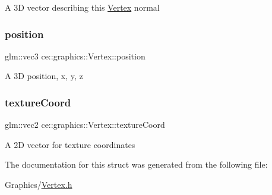 A 3D vector describing this \hyperlink{structce_1_1graphics_1_1_vertex}{Vertex} normal \mbox{\label{structce_1_1graphics_1_1_vertex_aa38ddb0b29a672e67e790869f38282ff}} 
\subsubsection{\texorpdfstring{position}{position}}
{\footnotesize\ttfamily glm\+::vec3 ce\+::graphics\+::\+Vertex\+::position}

A 3D position, x, y, z \mbox{\label{structce_1_1graphics_1_1_vertex_a1dd8f6082878c241afc66226b3c45ea0}} 
\subsubsection{\texorpdfstring{texture\+Coord}{textureCoord}}
{\footnotesize\ttfamily glm\+::vec2 ce\+::graphics\+::\+Vertex\+::texture\+Coord}

A 2D vector for texture coordinates 

The documentation for this struct was generated from the following file\+:\begin{DoxyCompactItemize}
\item 
Graphics/\hyperlink{_vertex_8h}{Vertex.\+h}\end{DoxyCompactItemize}
